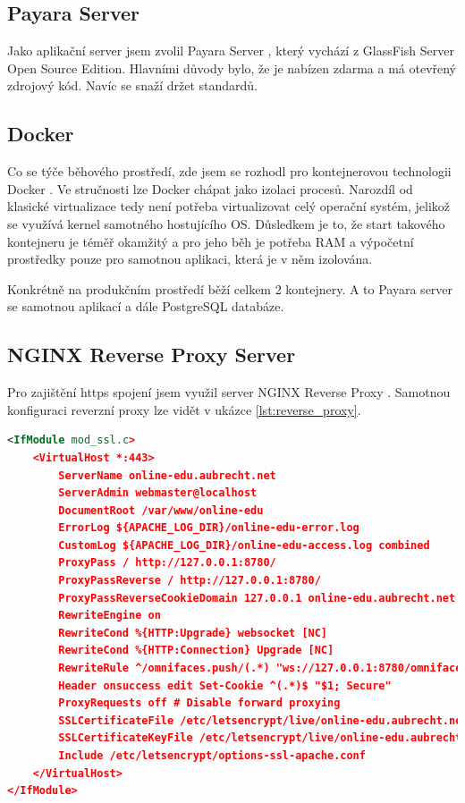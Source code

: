 \documentclass[twoside]{ctuthesis}
\theoremstyle{plain}
\theoremstyle{definition}
\theoremstyle{note}
\begin{document}
\subsection{Payara Server}
Jako aplikační server jsem zvolil Payara Server \cite{payara}, který vychází z GlassFish Server Open Source Edition. Hlavními důvody bylo, že je nabízen zdarma a má otevřený zdrojový kód. Navíc se snaží držet standardů.

\subsection{Docker}
Co se týče běhového prostředí, zde jsem se rozhodl pro kontejnerovou technologii Docker \cite{docker}. Ve stručnosti lze Docker chápat jako izolaci procesů. Narozdíl od klasické virtualizace tedy není potřeba virtualizovat celý operační systém, jelikož se využívá kernel samotného hostujícího OS. Důsledkem je to, že start takového kontejneru je téměř okamžitý a pro jeho běh je potřeba RAM a výpočetní prostředky pouze pro samotnou aplikaci, která je v něm izolována.

Konkrétně na produkčním prostředí běží celkem 2 kontejnery. A to Payara server se samotnou aplikací a dále PostgreSQL databáze.

\subsection{NGINX Reverse Proxy Server}
Pro zajištění https spojení jsem využil server NGINX Reverse Proxy \cite{nginx}. Samotnou konfiguraci reverzní proxy lze vidět v ukázce \ref{lst:reverse_proxy}.

\begin{minipage}{\linewidth}
    \begin{lstlisting}[language=XML, label={lst:reverse_proxy}, caption=Ukázka konfigurace reverzní proxy]
<IfModule mod_ssl.c>
	<VirtualHost *:443>
		ServerName online-edu.aubrecht.net
		ServerAdmin webmaster@localhost
		DocumentRoot /var/www/online-edu
		ErrorLog ${APACHE_LOG_DIR}/online-edu-error.log
		CustomLog ${APACHE_LOG_DIR}/online-edu-access.log combined
		ProxyPass / http://127.0.0.1:8780/
		ProxyPassReverse / http://127.0.0.1:8780/
		ProxyPassReverseCookieDomain 127.0.0.1 online-edu.aubrecht.net
		RewriteEngine on
		RewriteCond %{HTTP:Upgrade} websocket [NC]
		RewriteCond %{HTTP:Connection} Upgrade [NC]
		RewriteRule ^/omnifaces.push/(.*) "ws://127.0.0.1:8780/omnifaces.push/$1" [P,L]
		Header onsuccess edit Set-Cookie ^(.*)$ "$1; Secure"
		ProxyRequests off # Disable forward proxying
		SSLCertificateFile /etc/letsencrypt/live/online-edu.aubrecht.net/fullchain.pem
		SSLCertificateKeyFile /etc/letsencrypt/live/online-edu.aubrecht.net/privkey.pem
		Include /etc/letsencrypt/options-ssl-apache.conf
	</VirtualHost>
</IfModule>
    \end{lstlisting}
\end{minipage}
\end{document}
